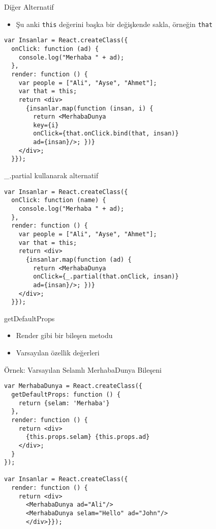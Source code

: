 \documentclass[presentation]{beamer}
\begin{document}
\begin{frame}[fragile,label=sec-18]{Diğer Alternatif}
 \begin{itemize}
\item Şu anki \texttt{this} değerini başka bir değişkende sakla, örneğin \texttt{that}
\end{itemize}

\begin{verbatim}
var Insanlar = React.createClass({
  onClick: function (ad) {
    console.log("Merhaba " + ad);
  },
  render: function () {
    var people = ["Ali", "Ayse", "Ahmet"];
    var that = this;
    return <div>
      {insanlar.map(function (insan, i) {
        return <MerhabaDunya
        key={i}
        onClick={that.onClick.bind(that, insan)}
        ad={insan}/>; })}
    </div>;
  }});
\end{verbatim}
\end{frame}


\begin{frame}[fragile,label=sec-19]{\_.partial kullanarak alternatif}
 \begin{verbatim}
var Insanlar = React.createClass({
  onClick: function (name) {
    console.log("Merhaba " + ad);
  },
  render: function () {
    var people = ["Ali", "Ayse", "Ahmet"];
    var that = this;
    return <div>
      {insanlar.map(function (ad) {
        return <MerhabaDunya
        onClick={_.partial(that.onClick, insan)}
        ad={insan}/>; })}
    </div>;
  }});
\end{verbatim}
\end{frame}

\begin{frame}[label=sec-20]{getDefaultProps}
\begin{itemize}
\item Render gibi bir bileşen metodu
\item Varsayılan özellik değerleri
\end{itemize}
\end{frame}


\begin{frame}[fragile,label=sec-21]{Örnek: Varsayılan Selamlı MerhabaDunya Bileşeni}
 \begin{verbatim}
var MerhabaDunya = React.createClass({
  getDefaultProps: function () {
    return {selam: 'Merhaba'}
  },
  render: function () {
    return <div>
      {this.props.selam} {this.props.ad}
    </div>;
  }
});

var Insanlar = React.createClass({
  render: function () {
    return <div>
      <MerhabaDunya ad="Ali"/>
      <MerhabaDunya selam="Hello" ad="John"/>
      </div>}});
\end{verbatim}
\end{frame}
\end{document}
